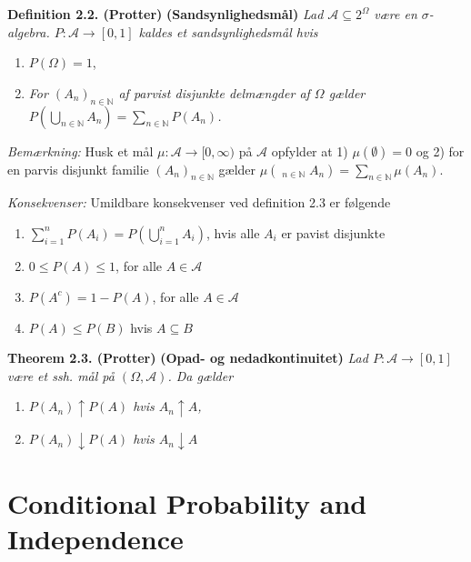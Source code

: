 \documentclass[
]{book}
\providecommand{\tightlist}{%
  \setlength{\itemsep}{0pt}\setlength{\parskip}{0pt}}
\begin{document}
\textbf{Definition 2.2. (Protter)} \textbf{(Sandsynlighedsmål)} \emph{Lad \(\mathcal{A}\subseteq2^\Omega\) være en \(\sigma\)-algebra. \(P : \mathcal{A}\to[0,1]\) kaldes et sandsynlighedsmål hvis}

\begin{enumerate}
\def\labelenumi{\arabic{enumi}.}
\tightlist
\item
  \(P(\Omega)=1\),
\item
  \emph{For \((A_n)_{n\in\mathbb{N}}\) af parvist disjunkte delmængder af \(\Omega\) gælder \(P\left(\bigcup_{n\in\mathbb{N}}A_n\right)=\sum_{n\in\mathbb{N}}P(A_n)\).}
\end{enumerate}

\emph{Bemærkning:} Husk et mål \(\mu : \mathcal{A}\to [0,\infty)\) på \(\mathcal{A}\) opfylder at 1) \(\mu(\emptyset)=0\) og 2) for en parvis disjunkt familie \((A_n)_{n\in\mathbb{N}}\) gælder \(\mu\left(\mathop{\dot{\bigcup}}_{n\in\mathbb{N}}A_n\right)=\sum_{n\in\mathbb{N}}\mu(A_n)\).

\emph{Konsekvenser:} Umildbare konsekvenser ved definition 2.3 er følgende

\begin{enumerate}
\def\labelenumi{\roman{enumi}.}
\tightlist
\item
  \(\sum_{i=1}^n P(A_i)=P\left(\bigcup_{i=1}^nA_i\right)\), hvis alle \(A_i\) er pavist disjunkte
\item
  \(0\le P(A)\le 1\), for alle \(A\in\mathcal{A}\)
\item
  \(P(A^c)=1-P(A)\), for alle \(A\in\mathcal{A}\)
\item
  \(P(A)\le P(B)\) hvis \(A\subseteq B\)
\end{enumerate}

\textbf{Theorem 2.3. (Protter)} \textbf{(Opad- og nedadkontinuitet)} \emph{Lad \(P : \mathcal{A}\to[0,1]\) være et ssh. mål på \((\Omega,\mathcal{A})\). Da gælder}

\begin{enumerate}
\def\labelenumi{\roman{enumi}.}
\setcounter{enumi}{2}
\tightlist
\item
  \emph{\(P(A_n)\uparrow P(A)\) hvis \(A_n\uparrow A\),}
\item
  \emph{\(P(A_n)\downarrow P(A)\) hvis \(A_n\downarrow A\)}
\end{enumerate}

\hypertarget{conditional-probability-and-independence}{%
\section{Conditional Probability and Independence}\label{conditional-probability-and-independence}}
\end{document}
